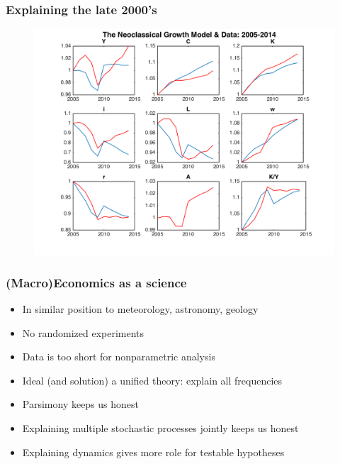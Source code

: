 \documentclass{beamer}
\begin{document}
\begin{frame}
\frametitle[alignment=center]{Explaining the late 2000's}
\begin{figure}
\centering
\includegraphics[scale=0.5]{Figures/Figure_9.png}
\end{figure}
\end{frame}


\begin{frame}
\frametitle[alignment=center]{(Macro)Economics as a science}
\begin{itemize}
\item In similar position to meteorology, astronomy, geology
\bigskip
\item No randomized experiments
\bigskip
\item Data is too short for nonparametric analysis
\bigskip
\item Ideal (and solution) a unified theory: explain all frequencies
\bigskip
\item Parsimony keeps us honest
\bigskip
\item Explaining multiple stochastic processes jointly keeps us honest
\bigskip
\item Explaining dynamics gives more role for testable hypotheses
\end{itemize}
\end{frame}
\end{document}
